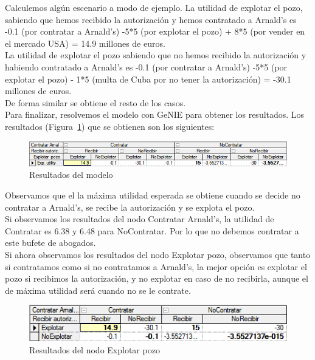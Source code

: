 \documentclass[12pt,a4paper,openright,final]{article}
\begin{document}
Calculemos algún escenario a modo de ejemplo. La utilidad de explotar el pozo, sabiendo que hemos recibido la autorización y hemos contratado a Arnald's es -0.1 (por contratar a Arnald's) -5*5 (por explotar el pozo) + 8*5 (por vender en el mercado USA) = 14.9 millones de euros.\\

La utilidad de explotar el pozo sabiendo que no hemos recibido la autorización y habiendo contratado a Arnald's es -0.1 (por contratar a Arnald's) -5*5 (por explotar el pozo) - 1*5 (multa de Cuba por no tener la autorización) = -30.1 millones de euros.\\

De forma similar se obtiene el resto de los casos.\\

Para finalizar, resolvemos el modelo con GeNIE para obtener los resultados. Los resultados (Figura~\ref{fig:resultado}) que se obtienen son los siguientes:\\

\begin{figure}[tbph!]
	\centering
	\includegraphics[width=\linewidth]{imagenes/resultado.png}
	\caption{Resultados del modelo}
	\label{fig:resultado}
\end{figure}

Observamos que el la máxima utilidad esperada se obtiene cuando se decide no contratar a Arnald's, se recibe la autorización y se explota el pozo.\\

Si observamos los resultados del nodo Contratar Arnald's, la utilidad de Contratar es 6.38 y 6.48 para NoContratar. Por lo que no debemos contratar a este bufete de abogados.\\

Si ahora observamos los resultados del nodo Explotar pozo, observamos que tanto si contratamos como si no contratamos a Arnald's, la mejor opción es explotar el pozo si recibimos la autorización, y no explotar en caso de no recibirla, aunque el de máxima utilidad será cuando no se le contrate.\\

\begin{figure}[tbph!]
	\centering
	\includegraphics[width=\linewidth]{imagenes/resultados_pozo.png}
	\caption{Resultados del nodo Explotar pozo}
	\label{fig:resultados_pozo}
\end{figure}
\end{document}
